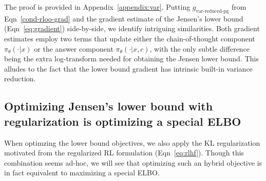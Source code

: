 \documentclass{article}
\theoremstyle{definition}
\begin{document}
The proof is provided in Appendix~\ref{appendix:var}. Putting $g_\text{var-reduced-pg}$ from Eqn~\eqref{cond-rloo-grad} and the gradient estimate of the Jensen's lower bound (Eqn~\eqref{eq:gradient}) side-by-side, we identify intriguing similarities. Both gradient estimates employ two terms that update either the chain-of-thought component $\pi_\theta(\cdot|x)$ or the answer component $\pi_\theta(\cdot|x,c)$, with the only subtle difference being the extra log-transform needed for obtaining the Jensen lower bound. This alludes to the fact that the lower bound gradient has intrinsic  built-in variance reduction.


\subsection{Optimizing Jensen's lower bound with regularization is optimizing a special ELBO}

When optimzing the lower bound objectives, we also apply the KL regularization motivated from the regularized RL formulation (Eqn~\eqref{eq:rlhf}). Though this combination seems ad-hoc, we will see that optimizing such an hybrid objective is in fact equivalent to maximizing a special ELBO.
\end{document}
